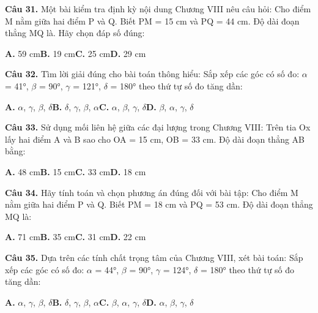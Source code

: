 \documentclass[11pt,a4paper]{article}
\begin{document}
\textbf{\color{primary} Câu 31.} Một bài kiểm tra định kỳ nội dung Chương VIII nêu câu hỏi: Cho điểm M nằm giữa hai điểm P và Q. Biết PM = 15 cm và PQ = 44 cm. Độ dài đoạn thẳng MQ là. Hãy chọn đáp số đúng:\par
\hspace*{1.5em}\textbf{A.} 59 cm\quad\quad \textbf{B.} 19 cm\quad\quad \textbf{C.} 25 cm\quad\quad \textbf{D.} 29 cm\par\vspace{2pt}
\textbf{\color{primary} Câu 32.} Tìm lời giải đúng cho bài toán thông hiểu: Sắp xếp các góc có số đo: $\alpha$ = 41°, $\beta$ = 90°, $\gamma$ = 121°, $\delta$ = 180° theo thứ tự số đo tăng dần:\par
\hspace*{1.5em}\textbf{A.} $\alpha$, $\gamma$, $\beta$, $\delta$\quad\quad \textbf{B.} $\delta$, $\gamma$, $\beta$, $\alpha$\quad\quad \textbf{C.} $\alpha$, $\beta$, $\gamma$, $\delta$\quad\quad \textbf{D.} $\beta$, $\alpha$, $\gamma$, $\delta$\par\vspace{2pt}
\textbf{\color{primary} Câu 33.} Sử dụng mối liên hệ giữa các đại lượng trong Chương VIII: Trên tia Ox lấy hai điểm A và B sao cho OA = 15 cm, OB = 33 cm. Độ dài đoạn thẳng AB bằng:\par
\hspace*{1.5em}\textbf{A.} 48 cm\quad\quad \textbf{B.} 15 cm\quad\quad \textbf{C.} 33 cm\quad\quad \textbf{D.} 18 cm\par\vspace{2pt}
\textbf{\color{primary} Câu 34.} Hãy tính toán và chọn phương án đúng đối với bài tập: Cho điểm M nằm giữa hai điểm P và Q. Biết PM = 18 cm và PQ = 53 cm. Độ dài đoạn thẳng MQ là:\par
\hspace*{1.5em}\textbf{A.} 71 cm\quad\quad \textbf{B.} 35 cm\quad\quad \textbf{C.} 31 cm\quad\quad \textbf{D.} 22 cm\par\vspace{2pt}
\textbf{\color{primary} Câu 35.} Dựa trên các tính chất trọng tâm của Chương VIII, xét bài toán: Sắp xếp các góc có số đo: $\alpha$ = 44°, $\beta$ = 90°, $\gamma$ = 124°, $\delta$ = 180° theo thứ tự số đo tăng dần:\par
\hspace*{1.5em}\textbf{A.} $\alpha$, $\gamma$, $\beta$, $\delta$\quad\quad \textbf{B.} $\delta$, $\gamma$, $\beta$, $\alpha$\quad\quad \textbf{C.} $\beta$, $\alpha$, $\gamma$, $\delta$\quad\quad \textbf{D.} $\alpha$, $\beta$, $\gamma$, $\delta$\par\vspace{2pt}
\end{document}
